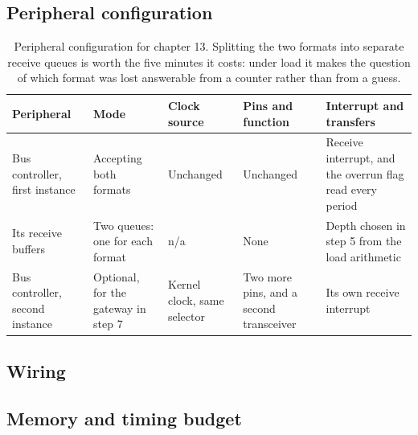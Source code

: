 \subsection*{Peripheral configuration}

\begin{table}[H]\centering\small
\begin{tabular}{p{22mm}p{26mm}p{24mm}p{30mm}p{30mm}}
\toprule
Peripheral & Mode & Clock source & Pins and function & Interrupt and transfers \\
\midrule
Bus controller, first instance & Accepting both formats & Unchanged & Unchanged & Receive interrupt, and the overrun flag read every period \\
Its receive buffers & Two queues: one for each format & n/a & None & Depth chosen in step 5 from the load arithmetic \\
Bus controller, second instance & Optional, for the gateway in step 7 & Kernel clock, same selector & Two more pins, and a second transceiver & Its own receive interrupt \\
\bottomrule
\end{tabular}
\caption{Peripheral configuration for chapter 13. Splitting the two formats into separate receive queues is worth the five minutes it costs: under load it makes the question of which format was lost answerable from a counter rather than from a guess.}
\end{table}

\subsection*{Wiring}


\subsection*{Memory and timing budget}

